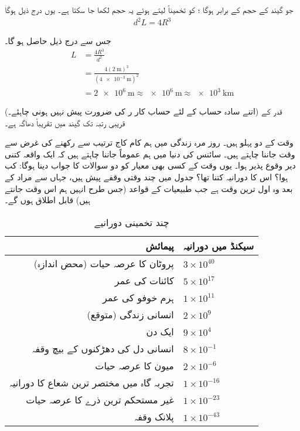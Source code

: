 جو گیند کے حجم   کے برابر ہوگا ؛   کو تخمیناً  لیتے ہوئے  یہ حجم  لکھا جا سکتا ہے۔ یوں درج ذیل ہوگا
\begin{align*}
d^{2}L=4R^{3}
\end{align*}

جس سے درج ذیل حاصل ہو گا۔
\begin{align*}
L&=\frac{4R^{3}}{d^{2}}\\
&=\frac{4(\SI{2}{\meter})^3}{(\SI{4e-3}{\meter})^2}\\
&=\SI{2e6}{\meter}\approx \SI{e6}{\meter}\approx \SI{e3}{\kilo\meter}
\end{align*}

(اتنے  سادہ حساب کے لئے حساب کار ر کی ضرورت پیش نہیں ہونی  چاہئے۔)    قدر  کے  قریبی رتبہ تک  گیند میں تقریباً  دھاگہ ہے۔


وقت کے دو پہلو ہیں۔ روز مرہ زندگی میں ہم  کام   کاج ترتیب سے رکھنے کی غرض سے وقت جاننا چاہتے ہیں۔ سائنس کی دنیا میں ہم عموماً جاننا چاہتے ہیں کہ ایک واقعہ کتنی  دیر وقوع پذیر ہوا۔ یوں وقت کے کسی بھی  معیار کو دو سوالات کا جواب دینا ہوگا: کب ہوا؟ اس کا دورانیہ کتنا تھا؟ جدول   میں چند وقتی وقفے پیش ہیں، جہاں  سے مراد    کے  بعد  وہ   اول ترین وقت ہے جب طبیعیات کے قواعد (جس طرح انہیں ہم اس وقت  جانتے ہیں)  قابل اطلاق ہوں گے۔

\begin{table}[h!]
\caption{چند تخمینی دورانیے}
\label{جدول_پیمائش_تخمینی_دورانیے}
\centering
\begin{tabular}{r l}
\toprule
پیمائش & سیکنڈ میں دورانیہ \\
\midrule
پروٹان کا عرصہ  حیات (محض  اندازہ)  & $3\times 10^{40}$\\
کائنات کی عمر & $5\times 10^{17}$\\
ہرم  خوفو      کی عمر & $1\times 10^{11}$\\
انسانی زندگی   (متوقع) & $2\times 10^{9}$ \\
ایک دن & $9\times 10^{4}$ \\
انسانی دل کی دھڑکنوں کے بیچ وقفہ & $8\times 10^{-1}$\\
میون کا عرصہ حیات & $2\times 10^{-6}$\\
تجربہ گاہ میں  مختصر ترین   شعاع کا دورانیہ & $1\times 10^{-16}$\\
  غیر مستحکم ترین  ذرے کا عرصہ حیات & $1\times 10^{-23}$\\
پلانک وقفہ  & $1\times 10^{-43}$\\
\bottomrule
\end{tabular}
\end{table}

